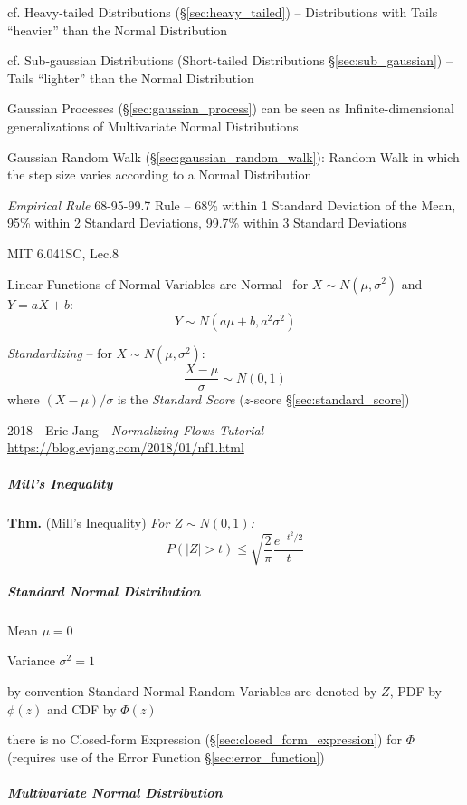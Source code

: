 cf. Heavy-tailed Distributions (\S\ref{sec:heavy_tailed}) --
Distributions with Tails ``heavier'' than the Normal Distribution

cf. Sub-gaussian Distributions (Short-tailed Distributions
\S\ref{sec:sub_gaussian}) -- Tails ``lighter'' than the Normal Distribution

\fist Gaussian Processes (\S\ref{sec:gaussian_process}) can be seen as
Infinite-dimensional generalizations of Multivariate Normal Distributions

\fist Gaussian Random Walk (\S\ref{sec:gaussian_random_walk}): Random Walk in
which the step size varies according to a Normal Distribution

\emph{Empirical Rule} 68-95-99.7 Rule -- 68\% within 1 Standard Deviation of the
Mean, 95\% within 2 Standard Deviations, 99.7\% within 3 Standard Deviations

MIT 6.041SC, Lec.8

Linear Functions of Normal Variables are Normal--
for $X \sim N(\mu, \sigma^2)$ and $Y = aX + b$:
\[
  Y \sim N(a \mu + b, a^2 \sigma^2)
\]

\emph{Standardizing} -- for $X \sim N(\mu, \sigma^2)$:
\[
  \frac{X - \mu}{\sigma} \sim N(0, 1)
\]
where $(X - \mu)/\sigma$ is the \emph{Standard Score}
($z$-score \S\ref{sec:standard_score})

2018 - Eric Jang
- \emph{Normalizing Flows Tutorial}
- \url{https://blog.evjang.com/2018/01/nf1.html}



\subparagraph{Mill's Inequality}\label{sec:mills_inequality}\hfill

\textbf{Thm.} (Mill's Inequality) \emph{
  For $Z \sim N(0,1)$:
  \[
    P(|Z| > t) \leq \sqrt{\frac{2}{\pi}}\frac{e^{-t^2/2}}{t}
  \]
}



\subparagraph{Standard Normal Distribution}\label{sec:standard_normal}\hfill

Mean $\mu = 0$

Variance $\sigma^2 = 1$

by convention Standard Normal Random Variables are denoted by $Z$, PDF by
$\phi(z)$ and CDF by $\Phi(z)$

there is no Closed-form Expression (\S\ref{sec:closed_form_expression}) for
$\Phi$ (requires use of the Error Function \S\ref{sec:error_function})



\subparagraph{Multivariate Normal Distribution}\label{sec:multivariate_normal}
\hfill


